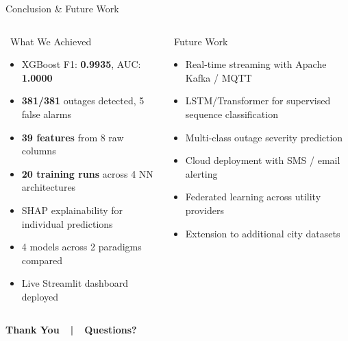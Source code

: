 \documentclass[aspectratio=169,10pt]{beamer}
\begin{document}
\begin{frame}{Conclusion \& Future Work}
\begin{columns}[t]
  \begin{exampleblock}{\faCheckCircle\ What We Achieved}
    \footnotesize
    \begin{itemize}\setlength\itemsep{3pt}
      \item XGBoost F1: \textbf{0.9935}, AUC: \textbf{1.0000}
      \item \textbf{381/381} outages detected, 5 false alarms
      \item \textbf{39 features} from 8 raw columns
      \item \textbf{20 training runs} across 4 NN architectures
      \item SHAP explainability for individual predictions
      \item 4 models across 2 paradigms compared
      \item Live Streamlit dashboard deployed
    \end{itemize}
  \end{exampleblock}
  \begin{block}{\faRocket\ Future Work}
    \footnotesize
    \begin{itemize}\setlength\itemsep{3pt}
      \item Real-time streaming with Apache Kafka / MQTT
      \item LSTM/Transformer for supervised sequence classification
      \item Multi-class outage severity prediction
      \item Cloud deployment with SMS / email alerting
      \item Federated learning across utility providers
      \item Extension to additional city datasets
    \end{itemize}
  \end{block}
\end{columns}
\vspace{6pt}
\centering
{\large\textcolor{PrimaryBlue}{\textbf{Thank You\ \ |\ \ Questions?}}}
\end{frame}
\end{document}
